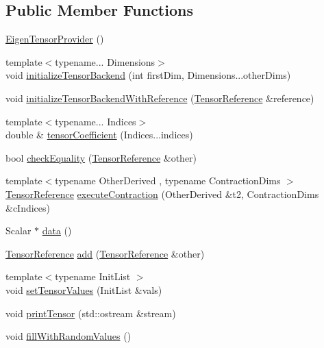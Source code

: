 \subsection*{Public Member Functions}
\begin{DoxyCompactItemize}
\item 
\hyperlink{a00014_a666937cbdec96978bdd47132a95ab9e6}{Eigen\+Tensor\+Provider} ()
\item 
{\footnotesize template$<$typename... Dimensions$>$ }\\void \hyperlink{a00014_a2d624402c063c0398f018417aae2fe28}{initialize\+Tensor\+Backend} (int first\+Dim, Dimensions...\+other\+Dims)
\item 
void \hyperlink{a00014_a135f00852433ce76d65d8e97e742b60f}{initialize\+Tensor\+Backend\+With\+Reference} (\hyperlink{a00103_a744d7805ef98562de55f32012ab11cfb}{Tensor\+Reference} \&reference)
\item 
{\footnotesize template$<$typename... Indices$>$ }\\double \& \hyperlink{a00014_af546ed4af5f2085c29fc499303bd681a}{tensor\+Coefficient} (Indices...\+indices)
\item 
bool \hyperlink{a00014_af0f8d3e7d83dbd3271ace3f1380d8c7f}{check\+Equality} (\hyperlink{a00103_a744d7805ef98562de55f32012ab11cfb}{Tensor\+Reference} \&other)
\item 
{\footnotesize template$<$typename Other\+Derived , typename Contraction\+Dims $>$ }\\\hyperlink{a00103_a744d7805ef98562de55f32012ab11cfb}{Tensor\+Reference} \hyperlink{a00014_a399a801dc4b785e93893030b84d6b3e2}{execute\+Contraction} (Other\+Derived \&t2, Contraction\+Dims \&c\+Indices)
\item 
Scalar $\ast$ \hyperlink{a00014_aff5626be9e55f593f0a6b71174ecbd8a}{data} ()
\item 
\hyperlink{a00103_a744d7805ef98562de55f32012ab11cfb}{Tensor\+Reference} \hyperlink{a00014_a4bda8a253c803e650987c20628c81c65}{add} (\hyperlink{a00103_a744d7805ef98562de55f32012ab11cfb}{Tensor\+Reference} \&other)
\item 
{\footnotesize template$<$typename Init\+List $>$ }\\void \hyperlink{a00014_a3d02dbf7e2d255a1378084aa6459cf25}{set\+Tensor\+Values} (Init\+List \&vals)
\item 
void \hyperlink{a00014_a607ad28d9f0b8b7f639dc1b0693dfd03}{print\+Tensor} (std\+::ostream \&stream)
\item 
void \hyperlink{a00014_a461c3348c66ae011167d8c194c79dce9}{fill\+With\+Random\+Values} ()

\end{DoxyCompactItemize}
